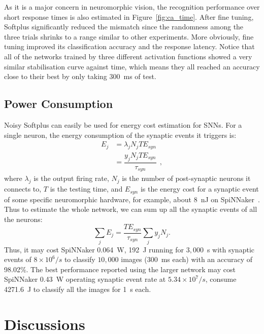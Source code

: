 	As it is a major concern in neuromorphic vision, the recognition performance over short response times is also estimated in Figure~\ref{fig:ca_time}.
	After fine tuning, Softplus significantly reduced the mismatch since the randomness among the three trials shrinks to a range similar to other experiments.
	More obviously, fine tuning improved its classification accuracy and the response latency.
	Notice that all of the networks trained by three different activation functions showed a very similar stabilisation curve against time, which means they all reached an accuracy close to their best by only taking 300~ms of test. 
	
	
	\subsection{Power Consumption}
	Noisy Softplus can easily be used for energy cost estimation for SNNs.
	For a single neuron, the energy consumption of the synaptic events it triggers is:
	\begin{equation}
	\begin{aligned}
	E_{j} &= \lambda_j N_j T E_{syn}\\
	&= \dfrac{y_j N_j T E_{syn}}{\tau_{syn}}~~,
	\end{aligned}
	\label{equ:energy}
	\end{equation}
	where $\lambda_j$ is the output firing rate, $N_j$ is the number of post-synaptic neurons it connects to, $T$ is the testing time, and $E_{syn}$ is the energy cost for a synaptic event of some specific neuromorphic hardware, for example, about 8~nJ on SpiNNaker~\cite{stromatias2013power}.
	Thus to estimate the whole network, we can sum up all the synaptic events of all the neurons:
	\begin{equation}
	\sum_j E_{j} =  \dfrac{T E_{syn}}{\tau_{syn}} \sum_{j}y_j N_j.
	\end{equation}
	Thus, it may cost SpiNNaker 0.064~W, 192~J running for $3,000$~s with synaptic events of $8\times10^6/s$ to classify $10,000$ images (300~ms each) with an accuracy of 98.02\%.
	The best performance reported using the larger network may cost SpiNNaker 0.43~W operating synaptic event rate at $5.34\times10^7/s$, consume 4271.6~J to classify all the images for 1~s each.
\section{Discussions}		
